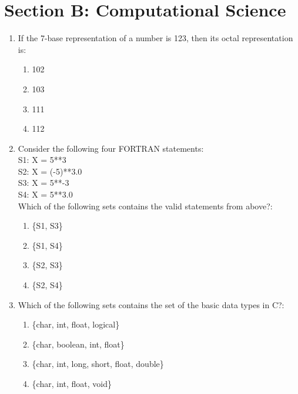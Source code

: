 \documentclass[journal,cmex10]{IEEEtran}
\theoremstyle{remark}
\numberwithin{equation}{enumi}
\numberwithin{figure}{enumi}
\begin{document}
\section*{Section B: Computational Science}
\vspace{2\baselineskip}
\begin{enumerate}[label=\arabic*)]

    \item If the 7-base representation of a number is 123, then its octal representation is:
    \bigskip
   \hfill {}
    \begin{enumerate}[label=\alph*)]
        \item 102
        \item 103
        \item 111
        \item 112
    \end{enumerate}
    \bigskip

    \item Consider the following four FORTRAN statements: \\
    S1: X = 5**3 \\
    S2: X = (-5)**3.0 \\
    S3: X = 5**-3 \\
    S4: X = 5**3.0 \\
    Which of the following sets contains the valid statements from above?:
    \bigskip
    \hfill {}
    \begin{enumerate}[label=\alph*)]
        \item \{S1, S3\}
        \item \{S1, S4\}
        \item \{S2, S3\}
        \item \{S2, S4\}
    \end{enumerate}
    \bigskip

    \item Which of the following sets contains the set of the basic data types in C?:
    \bigskip
    \hfill {}
    \begin{enumerate}[label=\alph*)]
        \item \{char, int, float, logical\}
        \item \{char, boolean, int, float\}
        \item \{char, int, long, short, float, double\}
        \item \{char, int, float, void\}
    \end{enumerate}
    \bigskip


\end{enumerate}
\end{document}
